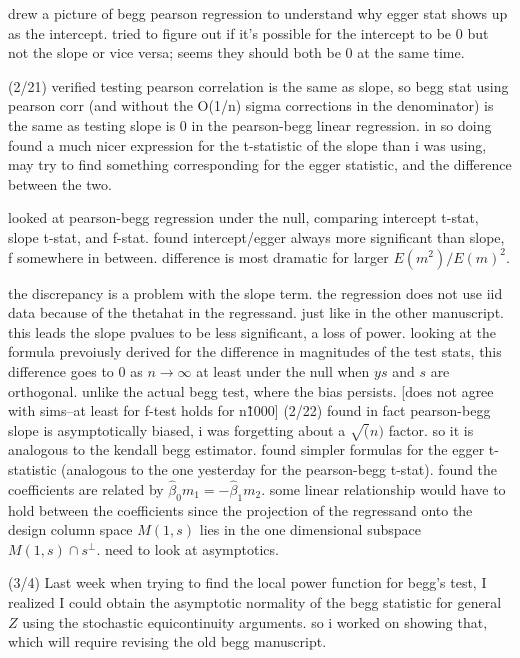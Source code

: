 \documentclass{article}
\begin{document}
drew a picture of begg pearson regression to understand why egger stat
shows up as the intercept. tried to figure out if it's possible for
the intercept to be 0 but not the slope or vice versa; seems they
should both be 0 at the same time.


(2/21) verified testing pearson correlation is the same as slope, so
begg stat using pearson corr (and without the O(1/n) sigma corrections
in the denominator) is the same as testing slope is 0 in the
pearson-begg linear regression. in so doing found a much nicer
expression for the t-statistic of the slope than i was using, may try
to find something corresponding for the egger statistic, and the
difference between the two.

looked at pearson-begg regression under the null, comparing intercept
t-stat, slope t-stat, and f-stat. found intercept/egger always more
significant than slope, f somewhere in between. difference is most
dramatic for larger $E(m^2)/E(m)^2$.

the discrepancy is a problem with the slope term. the regression does
not use iid data because of the thetahat in the regressand. just like
in the other manuscript. this leads the slope pvalues to be less
significant, a loss of power. looking at the formula prevoiusly
derived for the difference in magnitudes of the test stats, this
difference goes to 0 as $n\to\infty$ at least under the null when $ys$
and $s$ are orthogonal. unlike the actual begg test, where the bias
persists. [does not agree with sims--at least for f-test holds for
n\~1000] (2/22) found in fact pearson-begg slope is asymptotically
biased, i was forgetting about a $\sqrt(n)$ factor. so it is analogous
to the kendall begg estimator. found simpler formulas for the egger
t-statistic (analogous to the one yesterday for the pearson-begg
t-stat). found the coefficients are related by
$\hat\beta_0 m_1 = -\hat\beta_1 m_2$. some linear relationship would
have to hold between the coefficients since the projection of the
regressand onto the design column space $M(1,s)$ lies in the one
dimensional subspace $M(1,s)\cap s^\perp$. need to look at
asymptotics.


(3/4) Last week when trying to find the local power function for
begg's test, I realized I could obtain the asymptotic normality of the
begg statistic for general $Z$ using the stochastic equicontinuity
arguments. so i worked on showing that, which will require revising
the old begg manuscript.
\end{document}
